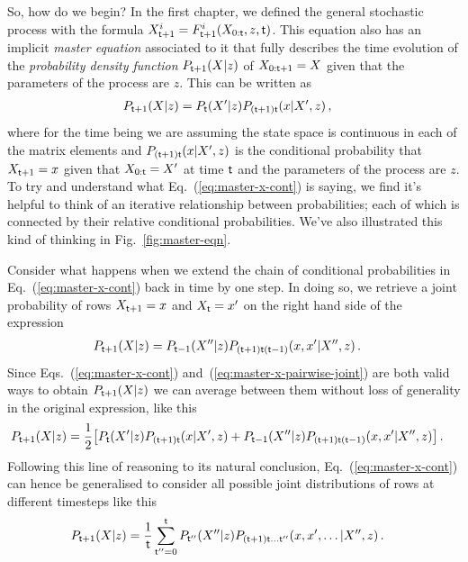 So, how do we begin? In the first chapter, we defined the general stochastic process with the formula $X^{i}_{{\sf t}+1} = F^{i}_{{\sf t}+1}(X_{0:{\sf t}},z,{\sf t})$. This equation also has an implicit \emph{master equation} associated to it that fully describes the time evolution of the \emph{probability density function} $P_{{\sf t}+1}(X\vert z)$ of $X_{0:{\sf t}+1}=X$ given that the parameters of the process are $z$. This can be written as
\begin{align}
P_{{\sf t}+1}(X\vert z) &= P_{{\sf t}}(X'\vert z) P_{({\sf t}+1){\sf t}}(x\vert X',z) \label{eq:master-x-cont}\,,
\end{align}
where for the time being we are assuming the state space is continuous in each of the matrix elements and $P_{({\sf t}+1){\sf t}}(x\vert X',z)$ is the conditional probability that $X_{{\sf t}+1}=x$ given that $X_{0:{\sf t}}=X'$ at time ${\sf t}$ and the parameters of the process are $z$. To try and understand what Eq.~(\ref{eq:master-x-cont}) is saying, we find it's helpful to think of an iterative relationship between probabilities; each of which is connected by their relative conditional probabilities. We've also illustrated this kind of thinking in Fig.~\ref{fig:master-eqn}.

Consider what happens when we extend the chain of conditional probabilities in Eq.~(\ref{eq:master-x-cont}) back in time by one step. In doing so, we retrieve a joint probability of rows $X_{{\sf t}+1}=x$ and $X_{{\sf t}}=x'$ on the right hand side of the expression 
\begin{align}
P_{{\sf t}+1}(X\vert z) &= P_{{\sf t}-1}(X''\vert z) P_{({\sf t}+1){\sf t}({\sf t}-1)}(x,x'\vert X'',z) \label{eq:master-x-pairwise-joint}\,.
\end{align}
Since Eqs.~(\ref{eq:master-x-cont}) and~(\ref{eq:master-x-pairwise-joint}) are both valid ways to obtain $P_{{\sf t}+1}(X\vert z)$ we can average between them without loss of generality in the original expression, like this
\begin{align}
P_{{\sf t}+1}(X\vert z) &= \frac{1}{2}\big[ P_{{\sf t}}(X'\vert z) P_{({\sf t}+1){\sf t}}(x\vert X',z) + P_{{\sf t}-1}(X''\vert z) P_{({\sf t}+1){\sf t}({\sf t}-1)}(x,x'\vert X'',z) \big]\,.
\end{align}
Following this line of reasoning to its natural conclusion, Eq.~(\ref{eq:master-x-cont}) can hence be generalised to consider all possible joint distributions of rows at different timesteps like this
\begin{align}
P_{{\sf t}+1}(X\vert z) &= \frac{1}{{\sf t}}\sum_{{\sf t}''=0}^{{\sf t}}P_{{\sf t}''}(X''\vert z) P_{({\sf t}+1){\sf t}\dots{\sf t}''}(x,x',\dots \vert X'',z) \label{eq:master-x-cont-sum-gen}\,.
\end{align}

